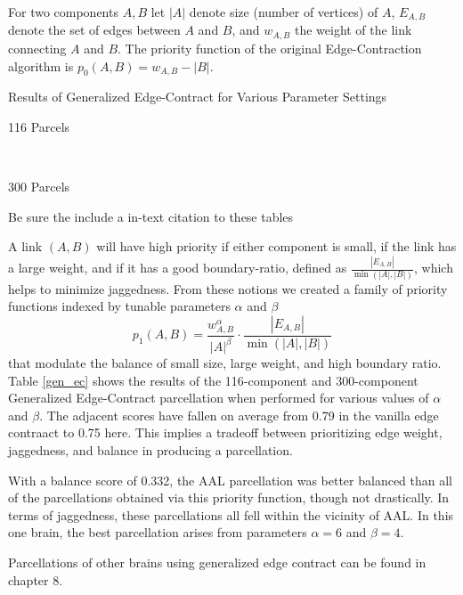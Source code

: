 For two components $A,B$ let $|A|$ denote size (number of vertices)
of $A$, $E_{A,B}$ denote the set of edges between $A$ and $B$, and
$w_{A,B}$ the weight of the link connecting $A$ and $B$.
The priority function of the original Edge-Contraction algorithm
is $p_0(A, B) = w_{A,B} - |B|$.

\begin{table}
\caption{Results of Generalized Edge-Contract for Various Parameter Settings}
\centering
\begin{subtable}[v]{0.5\textwidth}
  
  \caption{116 Parcels}
\end{subtable}
~
\begin{subtable}[v]{0.5\textwidth}
  
  \caption{300 Parcels}
\end{subtable}
\label{gen_ec}
\end{table}

{\color{red}Be sure the include a in-text citation to these tables}

A link $(A, B)$ will have high priority if either component is small,
if the link has a large weight, and if it has a good boundary-ratio,
defined as $\frac{|E_{A,B}|}{\min(|A|,|B|)}$, which helps to minimize
jaggedness. From these notions we created a family of priority
functions indexed by tunable parameters $\alpha$ and $\beta$
\begin{equation} \label{priority_func}
p_1(A, B) = \frac{w_{A,B}^\alpha}{|A|^\beta} \cdot
            \frac{|E_{A,B}|}{\min(|A|,|B|)}
\end{equation}
that modulate the balance of small size, large weight, and high
boundary ratio. Table \ref{gen_ec} shows the results of the
116-component and 300-component Generalized Edge-Contract parcellation
when performed for various values of $\alpha$ and $\beta$. The adjacent
scores have fallen on average from 0.79 in the vanilla edge contraact
to 0.75 here. This implies a tradeoff between prioritizing edge weight,
jaggedness, and balance in producing a parcellation.

With a balance score of 0.332, the AAL parcellation was better balanced
than all of the parcellations obtained via this priority function,
though not drastically. In terms of jaggedness, these parcellations
all fell within the vicinity of AAL. In this one brain, the best
parcellation arises from parameters $\alpha = 6$ and $\beta = 4$.

Parcellations of other brains using generalized edge contract can be
found in chapter 8.
